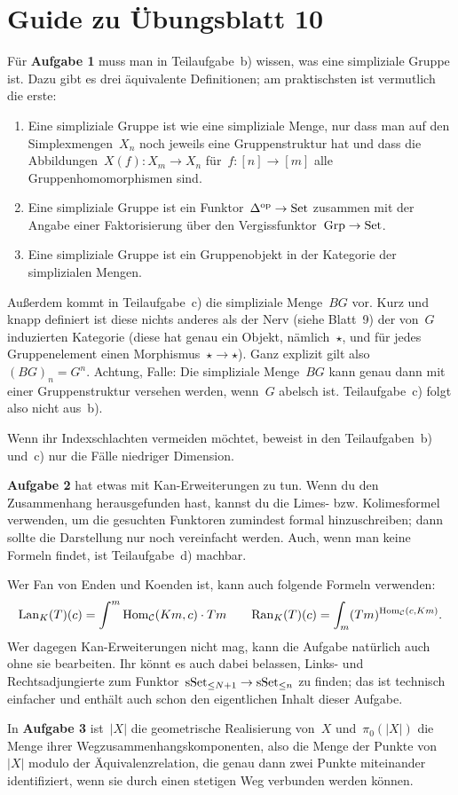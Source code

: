 \documentclass{uebblatt}
\begin{document}
\section*{Guide zu Übungsblatt 10}

Für \textbf{Aufgabe 1} muss man in Teilaufgabe~b) wissen, was eine simpliziale
Gruppe ist. Dazu gibt es drei äquivalente Definitionen; am praktischsten ist
vermutlich die erste:
\begin{enumerate}
\item Eine simpliziale Gruppe ist wie eine simpliziale Menge, nur dass man auf
den Simplexmengen~$X_n$ noch jeweils eine Gruppenstruktur hat und dass die
Abbildungen~$X(f) : X_m \to X_n$ für~$f : [n] \to [m]$ alle
Gruppenhomomorphismen sind.
\item Eine simpliziale Gruppe ist ein Funktor~$\Delta^{\mathrm{op}} \to \mathrm{Set}$ zusammen
mit der Angabe einer Faktorisierung über den Vergissfunktor~$\mathrm{Grp} \to \mathrm{Set}$.
\item Eine simpliziale Gruppe ist ein Gruppenobjekt in der Kategorie der
simplizialen Mengen.
\end{enumerate}

Außerdem kommt in Teilaufgabe~c) die simpliziale Menge~$BG$ vor. Kurz und knapp
definiert ist diese nichts anderes als der Nerv (siehe Blatt~9) der von~$G$
induzierten Kategorie (diese hat genau ein Objekt, nämlich~$\star$, und für
jedes Gruppenelement einen Morphismus~$\star \to \star$). Ganz explizit gilt
also~$(BG)_n = G^n$. Achtung, Falle: Die simpliziale Menge~$BG$ kann genau dann
mit einer Gruppenstruktur versehen werden, wenn~$G$ abelsch ist. Teilaufgabe~c)
folgt also nicht aus~b).

Wenn ihr Indexschlachten vermeiden möchtet, beweist in den Teilaufgaben~b)
und~c) nur die Fälle niedriger Dimension.

\textbf{Aufgabe 2} hat etwas mit Kan-Erweiterungen zu tun. Wenn du den
Zusammenhang herausgefunden hast, kannst du die Limes- bzw. Kolimesformel
verwenden, um die gesuchten Funktoren zumindest formal hinzuschreiben; dann
sollte die Darstellung nur noch vereinfacht werden. Auch, wenn man keine
Formeln findet, ist Teilaufgabe~d) machbar.

Wer Fan von Enden und Koenden ist, kann auch folgende Formeln verwenden:
\[ \mathrm{Lan}_K(T)(c) = \int^m \mathrm{Hom}_{\mathcal{C}}(Km,c) \cdot Tm \qquad
  \mathrm{Ran}_K(T)(c) = \int_m (Tm)^{\mathrm{Hom}_{\mathcal{C}}(c,Km)}. \]
Wer dagegen Kan-Erweiterungen nicht mag, kann die Aufgabe natürlich auch
ohne sie bearbeiten. Ihr könnt es auch dabei belassen, Links- und
Rechtsadjungierte zum Funktor~$\mathrm{sSet}_{\leq N+1} \to \mathrm{sSet}_{\leq n}$ zu finden;
das ist technisch einfacher und enthält auch schon den eigentlichen Inhalt
dieser Aufgabe.

In \textbf{Aufgabe 3} ist~$|X|$ die geometrische Realisierung von~$X$
und~$\pi_0(|X|)$ die Menge ihrer Wegzusammenhangskomponenten, also die Menge
der Punkte von~$|X|$ modulo der Äquivalenzrelation, die genau dann zwei Punkte
miteinander identifiziert, wenn sie durch einen stetigen Weg verbunden werden
können.
\end{document}
